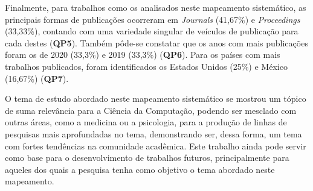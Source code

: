 \documentclass[conference]{IEEEtran}
\begin{document}
Finalmente, para trabalhos como os analisados neste mapeamento sistemático, as principais formas de publicações ocorreram em \textit{Journals} (41,67\%) e \textit{Proceedings} (33,33\%), contando com uma variedade singular de veículos de publicação para cada destes (\textbf{QP5}). Também pôde-se constatar que os anos com mais publicações foram os de 2020 (33,3\%) e 2019 (33,3\%) (\textbf{QP6}). Para os países com mais trabalhos publicados, foram identificados os Estados Unidos (25\%) e México (16,67\%) (\textbf{QP7}).

O tema de estudo abordado neste mapeamento sistemático se mostrou um tópico de suma relevância para a Ciência da Computação, podendo ser mesclado com outras áreas, como a medicina ou a psicologia, para a produção de linhas de pesquisas mais aprofundadas no tema, demonstrando ser, dessa forma, um tema com fortes tendências na comunidade acadêmica. Este trabalho ainda pode servir como base para o desenvolvimento de trabalhos futuros, principalmente para aqueles dos quais a pesquisa tenha como objetivo o tema abordado neste mapeamento.



\end{document}
